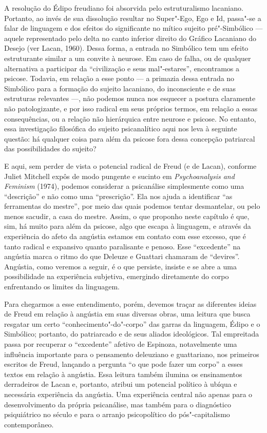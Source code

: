 A resolução do Édipo freudiano foi absorvida pelo estruturalismo
lacaniano. Portanto, ao invés de sua dissolução resultar no Super"-Ego,
Ego e Id, passa"-se a falar de linguagem e dos efeitos do significante no
mítico sujeito pré"-Simbólico --- aquele representado pelo delta no canto
inferior direito do Gráfico Lacaniano do Desejo (ver Lacan, 1960). Dessa
forma, a entrada no Simbólico tem um efeito estruturante similar a um
convite à neurose. Em caso de falha, ou de qualquer alternativa a
participar da ``civilização e seus mal"-estares'', encontramos a psicose.
Todavia, em relação a esse ponto --- a primazia dessa entrada no
Simbólico para a formação do sujeito lacaniano, do inconsciente e de
suas estruturas relevantes ---, não podemos nunca nos esquecer a postura
claramente não patologizante, e por isso radical em seus próprios
termos, em relação a essas consequências, ou a relação não hierárquica
entre neurose e psicose. No entanto, essa investigação filosófica do
sujeito psicanalítico aqui nos leva à seguinte questão: há qualquer
coisa para além da psicose fora dessa concepção patriarcal das
possibilidades do sujeito?

E aqui, sem perder de vista o potencial radical de Freud (e de Lacan),
conforme Juliet Mitchell expôs de modo pungente e sucinto em
\emph{Psychoanalysis and Feminism} (1974), podemos considerar a
psicanálise simplesmente como uma ``descrição'' e não como uma
``prescrição''. Ela nos ajuda a identificar ``as ferramentas do
mestre'', por meio das quais podemos tentar desmantelar, ou pelo menos
sacudir, a casa do mestre. Assim, o que proponho neste capítulo é que,
sim, há muito para além da psicose, algo que escapa à linguagem, e
através da experiência do afeto da angústia estamos em contato com esse
excesso, que é tanto radical e expansivo quanto paralisante e penoso.
Esse ``excedente'' na angústia marca o ritmo do que Deleuze e Guattari
chamaram de ``devires''. Angústia, como veremos a seguir, é o que
persiste, insiste e se abre a uma possibilidade na experiência
subjetiva, emergindo diretamente do corpo enfrentando os limites da
linguagem.

Para chegarmos a esse entendimento, porém, devemos traçar as diferentes
ideias de Freud em relação à angústia em suas diversas obras, uma
leitura que busca resgatar um certo ``conhecimento"-do"-corpo'' das garras
da linguagem, Édipo e o Simbólico; portanto, do patriarcado e de seus
aliados ideológicos. Tal empreitada passa por recuperar o ``excedente''
afetivo de Espinoza, notavelmente uma influência importante para o
pensamento deleuziano e guattariano, nos primeiros escritos de Freud,
lançando a pergunta ``o que pode fazer um corpo'' a esses textos em
relação à angústia. Essa leitura também ilumina os ensinamentos
derradeiros de Lacan e, portanto, atribui um potencial político à ubíqua
e necessária experiência da angústia. Uma experiência central não apenas
para o desenvolvimento da própria psicanálise, mas também para o
diagnóstico psiquiátrico no século  e para o arranjo psicopolítico do
pós"-capitalismo contemporâneo.

